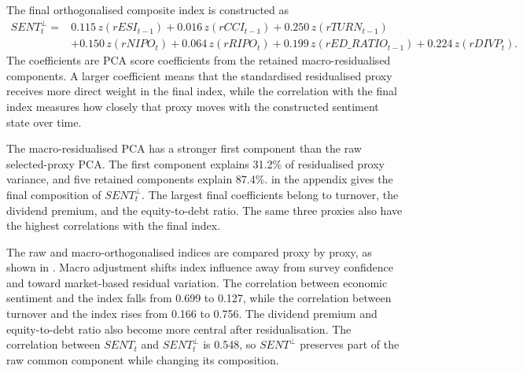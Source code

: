 \documentclass[11pt]{article}
\newcommand{\var}[1]{\ensuremath{#1}}
\begin{document}
The final orthogonalised composite index is constructed as
\begin{equation}
\begin{aligned}
    SENT^{\perp}_{t}
    ={}&
    0.115\,z(rESI_{t-1})
    + 0.016\,z(rCCI_{t-1})
    + 0.250\,z(rTURN_{t-1}) \\
    &+ 0.150\,z(rNIPO_t)
    + 0.064\,z(rRIPO_t)
    + 0.199\,z(rED\_RATIO_{t-1})
    + 0.224\,z(rDIVP_t).
\end{aligned}
\label{eq:sent_orth_composite}
\end{equation}
The coefficients are PCA score coefficients from the retained macro-residualised components. A larger coefficient means that the standardised residualised proxy receives more direct weight in the final index, while the correlation with the final index measures how closely that proxy moves with the constructed sentiment state over time.

The macro-residualised PCA has a stronger first component than the raw selected-proxy PCA. The first component explains 31.2\% of residualised proxy variance, and five retained components explain 87.4\%.  in the appendix gives the final composition of \var{SENT^{\perp}_t}. The largest final coefficients belong to turnover, the dividend premium, and the equity-to-debt ratio. The same three proxies also have the highest correlations with the final index.

The raw and macro-orthogonalised indices are compared proxy by proxy, as shown in . Macro adjustment shifts index influence away from survey confidence and toward market-based residual variation. The correlation between economic sentiment and the index falls from 0.699 to 0.127, while the correlation between turnover and the index rises from 0.166 to 0.756. The dividend premium and equity-to-debt ratio also become more central after residualisation. The correlation between \var{SENT_t} and \var{SENT^{\perp}_t} is 0.548, so \var{SENT^{\perp}} preserves part of the raw common component while changing its composition.
\end{document}
